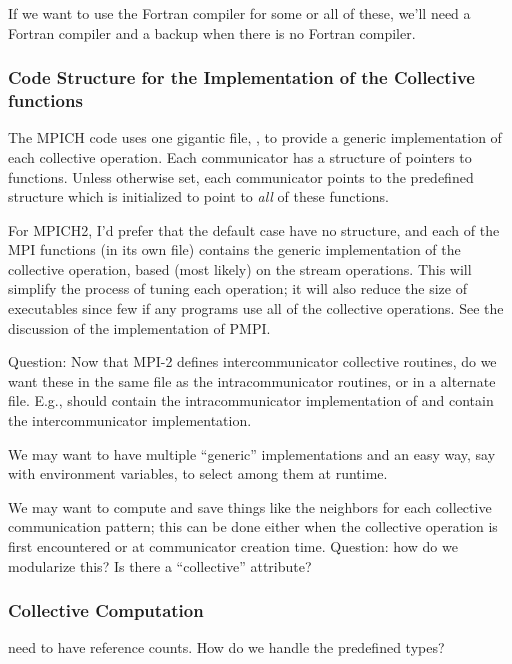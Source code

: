 \documentclass{article}
\begin{document}
If we want to use the Fortran compiler for some or all of these, we'll
need a Fortran compiler and a backup when there is no Fortran compiler.

\subsubsection{Code Structure for the Implementation of the Collective
  functions} 

The MPICH code uses one gigantic file, , to provide a
generic implementation of each collective operation.  Each
communicator has a structure of pointers to functions.  Unless
otherwise set, each communicator points to the predefined structure
 which is
initialized to point to \emph{all} of 
these functions.  

For MPICH2, I'd prefer that the default case have no structure, and
each of the MPI functions (in its own file) contains the generic
implementation of the collective operation, based (most likely) on the
stream operations.  This will simplify the process of tuning each
operation; it will also reduce the size of executables since few if
any programs use all of the collective operations.
See the discussion of the implementation of PMPI.

Question: Now that MPI-2 defines intercommunicator collective
routines, do we want these in the same file as the intracommunicator
routines, or in a alternate file.  E.g., should  contain
the intracommunicator implementation of  and
 contain the intercommunicator implementation.

We may want to have multiple ``generic'' implementations and an easy
way, say with environment variables, to select among them at runtime.

We may want to compute and save things like the neighbors for each
collective communication pattern; this can be done either when the
collective operation is first encountered or at communicator creation
time.  Question: how do we modularize this?  Is there a ``collective''
attribute?

\subsubsection{Collective Computation}
 need to have reference counts.  How do we handle the
predefined types?  

\subsubsection{}
\end{document}
